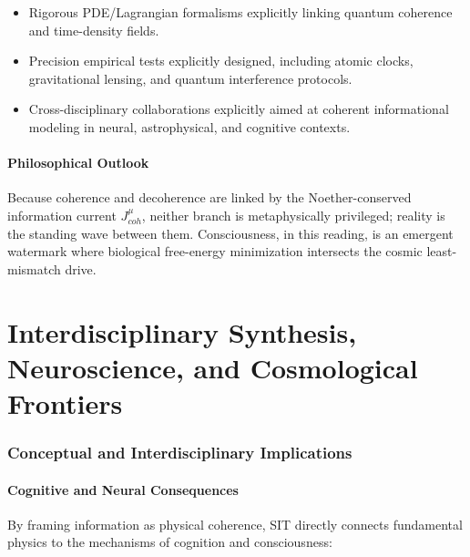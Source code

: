 \documentclass[american,11pt,letterpaper]{article}
\def\mathrm#1{#1}%
\begin{document}
\begin{itemize}
\item Rigorous PDE/Lagrangian formalisms explicitly linking quantum coherence and time-density fields.
\item Precision empirical tests explicitly designed, including atomic clocks, gravitational lensing, and quantum interference protocols.
\item Cross-disciplinary collaborations explicitly aimed at coherent informational modeling in neural, astrophysical, and cognitive contexts.
\end{itemize}

\subsection{Philosophical Outlook}

Because coherence and decoherence are linked by the Noether-conserved information current \(J_{\mathrm{coh}}^{\mu}\), neither branch is metaphysically privileged; reality is the standing wave between them.  Consciousness, in this reading, is an emergent watermark where biological free-energy minimization intersects the cosmic least-mismatch drive.
\part{Interdisciplinary Synthesis, Neuroscience, and Cosmological Frontiers}

\section{Conceptual and Interdisciplinary Implications}
\label{sec:conceptual-implications}

\subsection{Cognitive and Neural Consequences}

By framing information as physical coherence, SIT directly connects fundamental physics to the mechanisms of cognition and consciousness:
\end{document}
